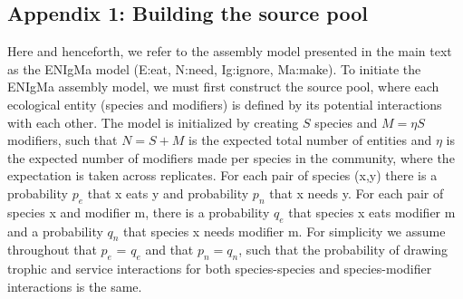 \documentclass[twocolumn,preprintnumbers,amsmath,amssymb,superscriptaddress,linenumbers]{revtex4-1}
\newcommand{\rr}[1]{{\rm #1}}
\begin{document}
% 

\subsection*{Appendix 1: Building the source pool}
Here and henceforth, we refer to the assembly model presented in the main text as the ENIgMa model (E:eat, N:need, Ig:ignore, Ma:make).
To initiate the ENIgMa assembly model, we must first construct the source pool, where each ecological entity (species and modifiers) is defined by its potential interactions with each other.
The model is initialized by creating $S$ species and $M = \eta S$ modifiers, such that $N=S+M$ is the expected total number of entities and $\eta$ is the expected number of modifiers made per species in the community, where the expectation is taken across replicates.
For each pair of species (x,y) there is a probability $p_e$ that x eats y and probability $p_n$ that x needs y.
For each pair of species x and modifier m, there is a probability $q_e$ that species x eats modifier m and a probability $q_n$ that species x needs modifier m.
For simplicity we assume throughout that $p_e$ = $q_e$ and that $p_n = q_n$, such that the probability of drawing trophic and service interactions for both species-species and species-modifier interactions is the same.
\end{document}
